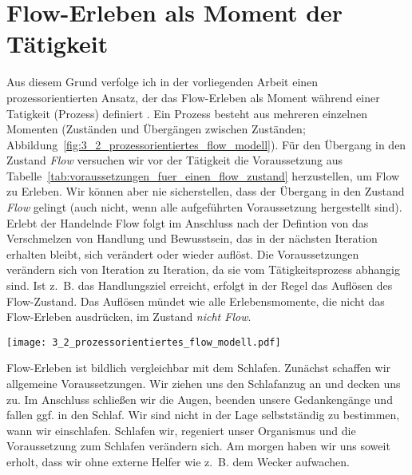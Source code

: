 
\section{Flow-Erleben als Moment der Tätigkeit} %
\label{sec:flow_erleben_als_moment_der_tatigkeit}

Aus diesem Grund verfolge ich in der vorliegenden Arbeit einen prozessorientierten Ansatz, der das Flow-Erleben als Moment während einer Tatigkeit (Prozess) definiert \citep[][S.~2]{Grueter2006}. Ein Prozess besteht aus mehreren einzelnen Momenten (Zuständen und Übergängen zwischen Zuständen; Abbildung~\ref{fig:3_2_prozessorientiertes_flow_modell}). Für den Übergang in den Zustand \emph{Flow} versuchen wir vor der Tätigkeit die Voraussetzung aus Tabelle~\ref{tab:voraussetzungen_fuer_einen_flow_zustand} herzustellen, um Flow zu Erleben. Wir können aber nie sicherstellen, dass der Übergang in den Zustand \emph{Flow} gelingt (auch nicht, wenn alle aufgeführten Voraussetzung hergestellt sind). Erlebt der Handelnde Flow folgt im Anschluss nach der Defintion von \citet{Henk2014} das Verschmelzen von Handlung und Bewusstsein, das in der nächsten Iteration erhalten bleibt, sich verändert oder wieder auflöst. Die Voraussetzungen verändern sich von Iteration zu Iteration, da sie vom Tätigkeitsprozess abhangig sind. Ist z.~B. das Handlungsziel erreicht, erfolgt in der Regel das Auflösen des Flow-Zustand. Das Auflösen mündet wie alle Erlebensmomente, die nicht das Flow-Erleben ausdrücken, im Zustand \emph{nicht Flow}. 

\begin{sidewaysfigure}
	\texttt{[image: 3\_2\_prozessorientiertes\_flow\_modell.pdf]}
	\caption[Prozessorientiertes Modell des Flow-Erlebens (Einführung)]{Prozessorientiertes Modell mit Auslassungen der implizit messbaren Auswirkungen des Flow-Erlebens}
	\label{fig:3_2_prozessorientiertes_flow_modell}
\end{sidewaysfigure}

Flow-Erleben ist bildlich vergleichbar mit dem Schlafen. Zunächst schaffen wir allgemeine Voraussetzungen. Wir ziehen uns den Schlafanzug an und decken uns zu. Im Anschluss schließen wir die Augen, beenden unsere Gedankengänge und fallen ggf. in den Schlaf. Wir sind nicht in der Lage selbstständig zu bestimmen, wann wir einschlafen. Schlafen wir, regeniert unser Organismus und die Voraussetzung zum Schlafen verändern sich. Am morgen haben wir uns soweit erholt, dass wir ohne externe Helfer wie z.~B. dem Wecker aufwachen.

